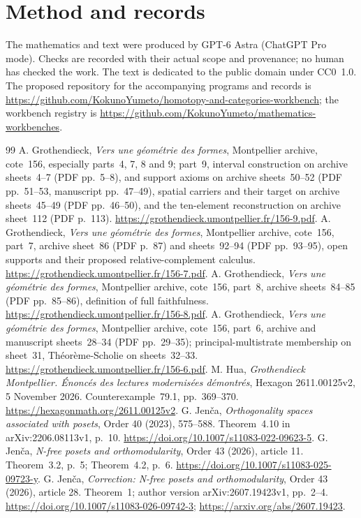 \documentclass[11pt,a4paper]{article}
\theoremstyle{definition}
\newcommand{\recordurl}{https://github.com/KokunoYumeto/mathematics-workbenches}
\newcommand{\workbenchurl}{https://github.com/KokunoYumeto/homotopy-and-categories-workbench}
\begin{document}
\section*{Method and records}
The mathematics and text were produced by GPT-6 Astra (ChatGPT Pro mode). Checks are recorded with their actual scope and provenance; no human has checked the work. The text is dedicated to the public domain under CC0~1.0. The proposed repository for the accompanying programs and records is \url{\workbenchurl}; the workbench registry is \url{\recordurl}.
\begingroup\small
\begin{thebibliography}{99}
 A. Grothendieck, \emph{Vers une g\'eom\'etrie des formes}, Montpellier archive, cote~156, especially parts~4, 7, 8 and 9; part~9, interval construction on archive sheets~4--7 (PDF pp.~5--8), and support axioms on archive sheets~50--52 (PDF pp.~51--53, manuscript pp.~47--49), spatial carriers and their target on archive sheets~45--49 (PDF pp.~46--50), and the ten-element reconstruction on archive sheet~112 (PDF p.~113). \url{https://grothendieck.umontpellier.fr/156-9.pdf}.
 A. Grothendieck, \emph{Vers une g\'eom\'etrie des formes}, Montpellier archive, cote~156, part~7, archive sheet~86 (PDF p.~87) and sheets~92--94 (PDF pp.~93--95), open supports and their proposed relative-complement calculus. \url{https://grothendieck.umontpellier.fr/156-7.pdf}.
 A. Grothendieck, \emph{Vers une g\'eom\'etrie des formes}, Montpellier archive, cote~156, part~8, archive sheets~84--85 (PDF pp.~85--86), definition of full faithfulness. \url{https://grothendieck.umontpellier.fr/156-8.pdf}.
 A. Grothendieck, \emph{Vers une g\'eom\'etrie des formes}, Montpellier archive, cote~156, part~6, archive and manuscript sheets~28--34 (PDF pp.~29--35); principal-multistrate membership on sheet~31, Th\'eor\`eme-Scholie on sheets~32--33. \url{https://grothendieck.umontpellier.fr/156-6.pdf}.
 M. Hua, \emph{Grothendieck Montpellier. \'Enonc\'es des lectures modernis\'ees d\'emontr\'es}, Hexagon 2611.00125v2, 5 November 2026. Counterexample~79.1, pp.~369--370. \url{https://hexagonmath.org/2611.00125v2}.
 G. Jen\v ca, \emph{Orthogonality spaces associated with posets}, Order 40 (2023), 575--588. Theorem~4.10 in arXiv:2206.08113v1, p.~10. \url{https://doi.org/10.1007/s11083-022-09623-5}.
 G. Jen\v ca, \emph{N-free posets and orthomodularity}, Order 43 (2026), article 11. Theorem~3.2, p.~5; Theorem~4.2, p.~6. \url{https://doi.org/10.1007/s11083-025-09723-y}.
 G. Jen\v ca, \emph{Correction: N-free posets and orthomodularity}, Order 43 (2026), article 28. Theorem~1; author version arXiv:2607.19423v1, pp.~2--4. \url{https://doi.org/10.1007/s11083-026-09742-3}; \url{https://arxiv.org/abs/2607.19423}.

\end{thebibliography}
\end{document}
